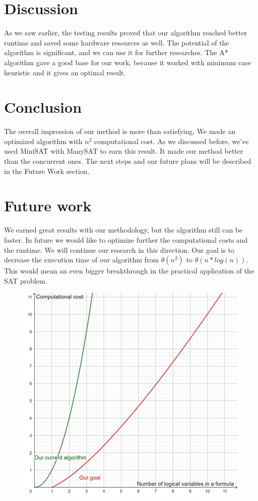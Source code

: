 \documentclass{article}
\begin{document}
\section{Discussion}
As we saw earlier, the testing results proved that our algorithm reached better runtime and saved some hardware resources as well. The potential of the algorithm is significant, and we can use it for further researches. The A* algorithm gave a good base for our work, because it worked with minimum case heuristic and it gives an optimal result.

\section{Conclusion}
The overall impression of our method is more than satisfying. We made an optimized algorithm with $n^2$ computational cost. As we discussed before, we've used MiniSAT with ManySAT to earn this result. It made our method better than the concurrent ones. The next steps and our future plans will be described in the Future Work section.

\section{Future work}

We earned great results with our methodology, but the algorithm still can be faster.
In future we would like to optimize further the computational costs and the runtime.
We will continue our research in this direction.
Our goal is to decrease the execution time of our algorithm from $\theta(n^2)$ to $\theta (n*log(n))$. This would mean an even bigger breakthrough in the practical application of the SAT problem. 
\begin{figure}[h]
    \centering
    \includegraphics[width=0.5\linewidth]{img/futurework.png}
\end{figure}
\end{document}
